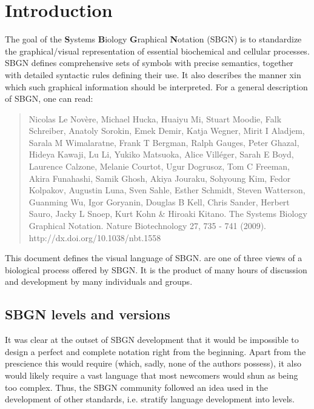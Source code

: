 

\chapter{Introduction}

The goal of the \textbf{S}ystems \textbf{B}iology \textbf{G}raphical 
\textbf{N}otation (SBGN) is to standardize the graphical/visual 
representation of essential biochemical and cellular processes. SBGN 
defines comprehensive sets of symbols with precise semantics, together with 
detailed syntactic rules defining their use.  It also describes the manner 
xin which such graphical information should be interpreted. For a general 
description of SBGN, one can read:

\begin{quote}
 Nicolas Le Nov\`{e}re, Michael Hucka, Huaiyu Mi, Stuart Moodie, Falk 
Schreiber, Anatoly Sorokin, Emek Demir, Katja Wegner, Mirit I Aladjem, 
Sarala M Wimalaratne, Frank T Bergman, Ralph Gauges, Peter Ghazal, Hideya 
Kawaji, Lu Li, Yukiko Matsuoka, Alice Vill\'{e}ger, Sarah E Boyd, Laurence 
Calzone, Melanie Courtot, Ugur Dogrusoz, Tom C Freeman, Akira Funahashi, 
Samik Ghosh, Akiya Jouraku, Sohyoung Kim, Fedor Kolpakov, Augustin Luna, 
Sven Sahle, Esther Schmidt, Steven Watterson, Guanming Wu, Igor Goryanin, 
Douglas B Kell, Chris Sander, Herbert Sauro, Jacky L Snoep, Kurt Kohn  \& 
Hiroaki Kitano. The Systems Biology Graphical Notation. Nature 
Biotechnology 27, 735 - 741 (2009).  http://dx.doi.org/10.1038/nbt.1558
\end{quote}

This document defines the \emph{\PD{}} visual language of SBGN. \PDs are 
one of three views of a biological process offered by SBGN.  It is the 
product of many hours of discussion and development by many individuals and 
groups.

\section{SBGN levels and versions}
\label{sec:sbgn-levels}

It was clear at the outset of SBGN development that it would be impossible 
to design a perfect and complete notation right from the beginning.  Apart 
from the prescience this would require (which, sadly, none of the authors 
possess), it also would likely require a vast language that most newcomers 
would shun as being too complex.  Thus, the SBGN community followed an idea 
used in the development of other standards, i.e. stratify language 
development into levels.

